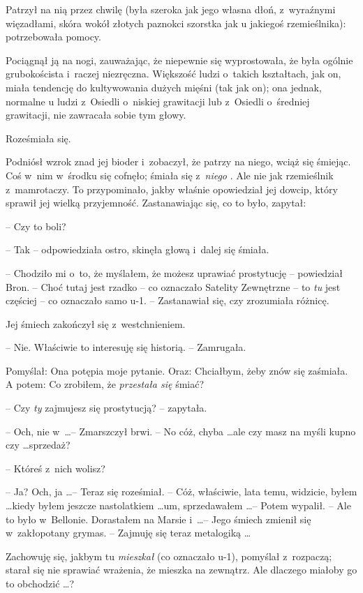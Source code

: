 \documentclass[oneside,polish,11pt,rmheadings]{mwbk}
\begin{document}
Patrzył na nią przez chwilę (była szeroka jak jego własna dłoń, z~wyraźnymi więzadłami, skóra wokół złotych paznokci szorstka jak u jakiegoś rzemieślnika): potrzebowała pomocy. 

Pociągnął ją na nogi, zauważając, że niepewnie się wyprostowała, że była ogólnie grubokoścista i~raczej niezręczna. Większość ludzi o~takich kształtach, jak on, miała tendencję do kultywowania dużych mięśni (tak jak on); ona jednak, normalne u ludzi z~Osiedli o~niskiej grawitacji lub z~Osiedli o~średniej grawitacji, nie zawracała sobie tym głowy. 

Roześmiała się. 

Podniósł wzrok znad jej bioder i~zobaczył, że patrzy na niego, wciąż się śmiejąc. Coś w~nim w~środku się cofnęło; śmiała się z~\textit{niego }. Ale nie jak rzemieślnik z~mamrotaczy. To przypominało, jakby właśnie opowiedział jej dowcip, który sprawił jej wielką przyjemność. Zastanawiając się, co to było, zapytał: 

-- Czy to boli? 

-- Tak -- odpowiedziała ostro, skinęła głową i~dalej się śmiała. 

-- Chodziło mi o~to, że myślałem, że możesz uprawiać prostytucję -- powiedział Bron. -- Choć tutaj jest rzadko -- co oznaczało Satelity Zewnętrzne -- to \textit{tu }jest częściej -- co oznaczało samo u-1. -- Zastanawiał się, czy zrozumiała różnicę. 

Jej śmiech zakończył się z~westchnieniem. 

-- Nie. Właściwie to interesuję się historią. -- Zamrugała. 

Pomyślał: Ona potępia moje pytanie. Oraz: Chciałbym, żeby znów się zaśmiała. A potem: Co zrobiłem, że \textit{przestała się } śmiać? 

-- Czy \textit{ty} zajmujesz się prostytucją? -- zapytała. 

-- Och, nie w~\ldots  -- Zmarszczył brwi. -- No cóż, chyba \ldots  ale czy masz na myśli kupno czy \ldots  sprzedaż? 

-- Któreś z~nich wolisz? 

-- Ja? Och, ja \ldots  -- Teraz się roześmiał. -- Cóż, właściwie, lata temu, widzicie, byłem \ldots  kiedy byłem jeszcze nastolatkiem \ldots  um, sprzedawałem \ldots  -- Potem wypalił. -- Ale to było w~Bellonie. Dorastałem na Marsie i~\ldots  -- Jego śmiech zmienił się w~zakłopotany grymas. -- Zajmuję się teraz metalogiką \ldots  

Zachowuję się, jakbym tu \textit{mieszkał }(co oznaczało u-1), pomyślał z~rozpaczą; starał się nie sprawiać wrażenia, że mieszka na zewnątrz. Ale dlaczego miałoby go to obchodzić \ldots ? 
\end{document}
